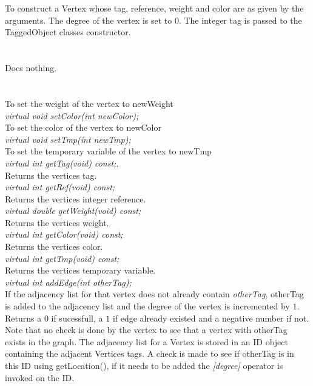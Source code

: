   \\
  \\
To construct a Vertex whose tag, reference, weight and color are as
given by the arguments. The degree of the vertex is set to $0$. The
integer \p tag is passed to the TaggedObject classes constructor.\\

  \\
  \\
Does nothing. \\

  \\
 \\
To set the weight of the vertex to \p newWeight \\    

{\em virtual void setColor(int newColor);} \\
To set the color of the vertex to \p newColor \\    

{\em virtual void setTmp(int newTmp);} \\
To set the temporary variable of the vertex to \p newTmp \\    

{\em virtual int getTag(void) const;}. \\
Returns the vertices tag.\\

{\em virtual int getRef(void) const; } \\
Returns the vertices integer reference.\\

{\em virtual double getWeight(void) const;} \\
Returns the vertices weight. \\

{\em virtual int getColor(void) const; } \\
Returns the vertices color. \\

{\em virtual int getTmp(void) const; } \\
Returns the vertices temporary variable. \\

{\em virtual int addEdge(int otherTag); } \\
If the adjacency list for that vertex does not already contain {\em
otherTag}, \p otherTag is added to the adjacency list and the
degree of the vertex is incremented by $1$. Returns a $0$ if
sucessfull, a $1$ if edge already existed and a negative number if
not. Note that no check is done by the vertex to see that a vertex
with \p otherTag exists in the graph. The adjacency list for a
Vertex is stored in an ID object containing the adjacent Vertices
tags. A check is made to see if \p otherTag is in this ID using
getLocation(), if it needs to be added the {\em [degree]}
operator is invoked on the ID. \\ 

